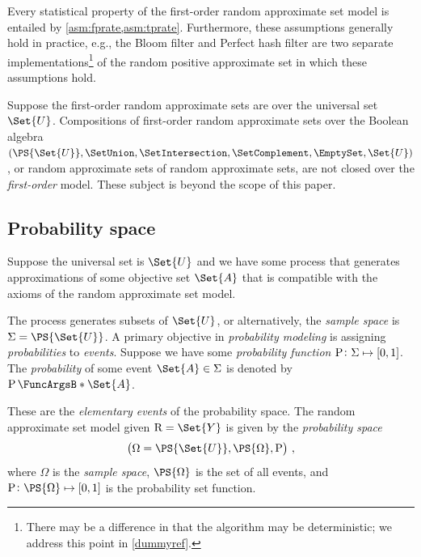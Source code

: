 \documentclass[10pt,final,hidelinks]{article}
\numberwithin{equation}{section}
\begin{document}
Every statistical property of the first-order random approximate set model is entailed by \cref{asm:fprate,asm:tprate}.
Furthermore, these assumptions generally hold in practice, e.g., the Bloom filter\cite{bf} and Perfect hash filter\cite{phf} are two separate implementations\footnote{There may be a difference in that the algorithm may be deterministic; we address this point in \cref{dummyref}.} of the random positive approximate set in which these assumptions hold.

Suppose the first-order random approximate sets are over the universal set $\Set{U}$.
Compositions of first-order random approximate sets over the Boolean algebra $(\PS{\Set{U}},\SetUnion,\SetIntersection,\SetComplement,\EmptySet,\Set{U})$, or random approximate sets of random approximate sets, are not closed over the \emph{first-order} model.
These subject is beyond the scope of this paper.

\subsection{Probability space}
\label{sec:prob_model}
Suppose the universal set is $\Set{U}$ and we have some process that generates approximations of some objective set $\Set{A}$ that is compatible with the axioms of the random approximate set model.


The process generates subsets of $\Set{U}$, or alternatively, the \emph{sample space} is $\Sigma = \PS{\Set{U}}$.
A primary objective in \emph{probability modeling} is assigning \emph{probabilities} to \emph{events}.
Suppose we have some \emph{probability function} $\mathrm{P} \colon \Sigma \mapsto [0,1]$.
The \emph{probability} of some event $\Set{A} \in \Sigma$ is denoted by $\Prob{\Set{A}}$.


These are the \emph{elementary events} of the probability space.
The random approximate set model given $\RV{R} = \Set{Y}$ is given by the \emph{probability space}
\begin{equation}
\left(\Omega = \PS{\Set{U}}, \PS{\Omega}, \Fun{P}\right)\,,
\end{equation}
where $\Omega$ is the \emph{sample space}, $\PS{\Omega}$ is the set of all events, and $\Fun{P} \colon \PS{\Omega} \mapsto [0,1]$ is the probability set function.


\end{document}
